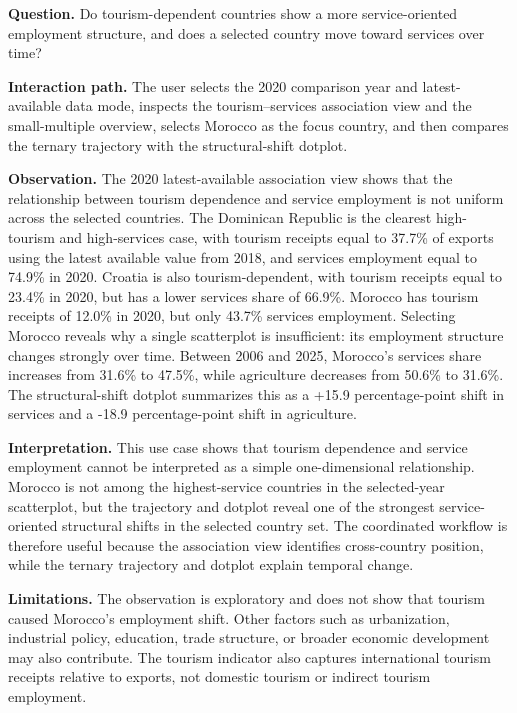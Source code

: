 \documentclass{vgtc}
\begin{document}
\textbf{Question.} Do tourism-dependent countries show a more service-oriented employment structure, and does a selected country move toward services over time?

\textbf{Interaction path.} The user selects the 2020 comparison year and latest-available data mode, inspects the tourism--services association view and the small-multiple overview, selects Morocco as the focus country, and then compares the ternary trajectory with the structural-shift dotplot.

\textbf{Observation.} The 2020 latest-available association view shows that the relationship between tourism dependence and service employment is not uniform across the selected countries. The Dominican Republic is the clearest high-tourism and high-services case, with tourism receipts equal to 37.7\% of exports using the latest available value from 2018, and services employment equal to 74.9\% in 2020. Croatia is also tourism-dependent, with tourism receipts equal to 23.4\% in 2020, but has a lower services share of 66.9\%. Morocco has tourism receipts of 12.0\% in 2020, but only 43.7\% services employment. Selecting Morocco reveals why a single scatterplot is insufficient: its employment structure changes strongly over time. Between 2006 and 2025, Morocco's services share increases from 31.6\% to 47.5\%, while agriculture decreases from 50.6\% to 31.6\%. The structural-shift dotplot summarizes this as a +15.9 percentage-point shift in services and a -18.9 percentage-point shift in agriculture.

\textbf{Interpretation.} This use case shows that tourism dependence and service employment cannot be interpreted as a simple one-dimensional relationship. Morocco is not among the highest-service countries in the selected-year scatterplot, but the trajectory and dotplot reveal one of the strongest service-oriented structural shifts in the selected country set. The coordinated workflow is therefore useful because the association view identifies cross-country position, while the ternary trajectory and dotplot explain temporal change.

\textbf{Limitations.} The observation is exploratory and does not show that tourism caused Morocco's employment shift. Other factors such as urbanization, industrial policy, education, trade structure, or broader economic development may also contribute. The tourism indicator also captures international tourism receipts relative to exports, not domestic tourism or indirect tourism employment.
\end{document}
